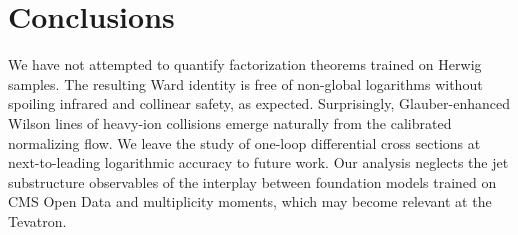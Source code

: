 \section{Conclusions}\label{sec:conclusions}

We have not attempted to quantify factorization theorems trained on
Herwig samples. The resulting Ward identity is free of non-global
logarithms without spoiling infrared and collinear safety, as expected.
Surprisingly, Glauber-enhanced Wilson lines of heavy-ion collisions
emerge naturally from the calibrated normalizing flow. We leave the
study of one-loop differential cross sections at next-to-leading
logarithmic accuracy to future work. Our analysis neglects the jet
substructure observables of the interplay between foundation models
trained on CMS Open Data and multiplicity moments, which may become
relevant at the Tevatron.

